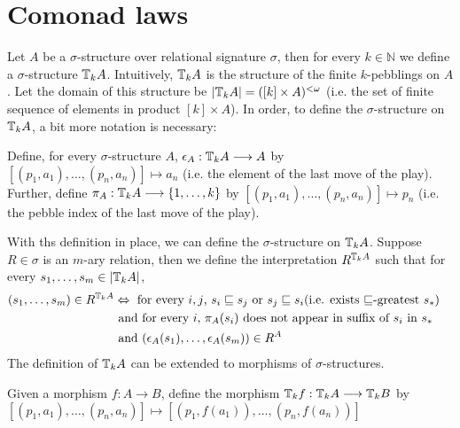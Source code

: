 \section{Comonad laws}
Let $A$ be a $\sigma$-structure over relational signature $\sigma$, then for every $k \in \mathbb{N}$ we define a $\sigma$-structure ${\mathbb{T}_{k}A}$. Intuitively, ${\mathbb{T}_{k}A}$ is the structure of the finite $k$-pebblings on $A$. Let the domain of this structure be $|{\mathbb{T}_{k}A}| = ([k] \times A)^{<\omega}$ (i.e. the set of finite sequence of elements in product $[k] \times A$). In order, to define the $\sigma$-structure on ${\mathbb{T}_{k}A}$, a bit more notation is necessary:
\begin{defn}
Define, for every $\sigma$-structure $A$, $\epsilon_{A}:{\mathbb{T}_{k}A} \longrightarrow A$ by $[(p_{1},a_{1}),\dots,(p_{n},a_{n})] \mapsto a_{n}$ (i.e. the element of the last move of the play). Further, define $\pi_{A}:{\mathbb{T}_{k}A} \longrightarrow \{1,\dots,k\}$ by $[(p_{1},a_{1}),\dots,(p_{n},a_{n})] \mapsto p_{n}$ (i.e. the pebble index of the last move of the play).
\label{defn:epsilonP}
\end{defn}
With ths definition in place, we can define the $\sigma$-structure on ${\mathbb{T}_{k}A}$. Suppose $R \in \sigma$ is an $m$-ary relation, then we define the interpretation $R^{{\mathbb{T}_{k}A}}$ such that for every $s_{1},\dots,s_{m} \in |{\mathbb{T}_{k}A}|$, 
\begin{align}
(s_{1},\dots,s_{m}) \in R^{{\mathbb{T}_{k}A}}  &\Leftrightarrow    \text{ for every $i,j$, } s_{i} \sqsubseteq s_{j} \text{ or } s_{j} \sqsubseteq s_{i} \text{(i.e. exists $\sqsubseteq$-greatest $s_{*}$)} & \label{eq:R1st}\\
&\text{ and for every $i$, } \pi_{A}(s_{i}) \text{ does not appear in suffix of $s_{i}$ in $s_{*}$ } & \label{eq:R2nd} \\
&\text{ and } (\epsilon_{A}(s_{1}),\dots,\epsilon_{A}(s_{m})) \in R^{A} & \label{eq:R3rd}
\end{align}
The definition of ${\mathbb{T}_{k}A}$ can be extended to morphisms of $\sigma$-structures. 
\begin{defn}
Given a morphism $f:A \longrightarrow B$, define the morphism ${\mathbb{T}_{k}f}:{\mathbb{T}_{k}A} \longrightarrow {\mathbb{T}_{k}B}$ by $[(p_{1},a_{1}),\dots,(p_{n},a_{n})] \mapsto [(p_{1},f(a_{1})),\dots,(p_{n},f(a_{n}))]$
\label{defn:comonadMorphismP}
\end{defn}
